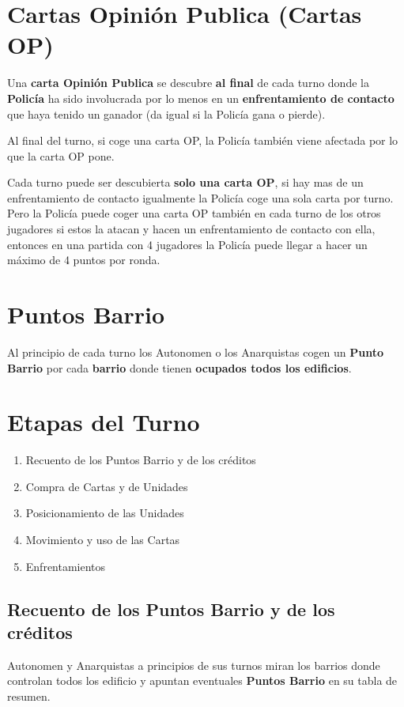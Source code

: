 \documentclass[a4paper,13pt]{scrartcl}
\begin{document}
\section*{Cartas Opini\'on Publica (Cartas OP)}
Una \textbf{carta Opini\'on Publica} se descubre \textbf{al final} de cada turno donde la \textbf{Polic\'ia} ha sido involucrada por lo menos en un
\textbf{enfrentamiento de contacto} que haya tenido un ganador (da igual si la Polic\'ia gana o pierde).

Al final del turno, si coge una carta OP, la Polic\'ia tambi\'en viene afectada por lo que la carta OP pone.

Cada turno puede ser descubierta \textbf{solo una carta OP}, si hay mas de un enfrentamiento de contacto igualmente la Polic\'ia
coge una sola carta por turno. Pero la Polic\'ia puede coger una carta OP tambi\'en en cada turno de los otros
jugadores si estos la atacan y hacen un enfrentamiento de contacto con ella, entonces en una partida con 4 jugadores la
Polic\'ia puede llegar a hacer un m\'aximo de 4 puntos por ronda.

\section*{Puntos Barrio}
Al principio de cada turno los Autonomen o los Anarquistas cogen un \textbf{Punto Barrio} por cada \textbf{barrio} donde tienen \textbf{ocupados
todos los edificios}.

\section*{Etapas del Turno}
\begin{enumerate}
\item Recuento de los Puntos Barrio y de los cr\'editos
\item Compra de Cartas y de Unidades
\item Posicionamiento de las Unidades
\item Movimiento y uso de las Cartas
\item Enfrentamientos
\end{enumerate}

\subsection{Recuento de los Puntos Barrio y de los
cr\'editos}
Autonomen y Anarquistas a principios de sus turnos miran los barrios donde controlan todos los edificio y apuntan
eventuales \textbf{Puntos Barrio} en su tabla de resumen.
\end{document}
